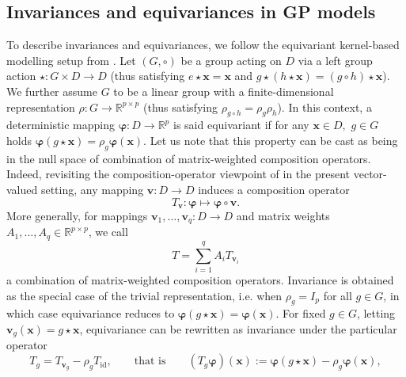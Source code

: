 \documentclass[11pt,a4paper]{article}
\newcommand{\bx}{\boldsymbol{x}}
\begin{document}
\subsection{Invariances and equivariances in GP  models}
\label{subsec:inv-eq-background}

To describe invariances and equivariances, we follow the  equivariant kernel-based modelling setup from \cite{JMLR:v8:reisert07a,steinertintegration}.
Let $(G,\circ)$ be a %
group acting on $D$ via a %
left group action $\star : G \times D \to D$ (thus satisfying $e \star \bx = \bx$ and $g \star (h \star \bx) = (g \circ h) \star \bx$). We further assume $G$ to be a linear group with a finite-dimensional representation  $\rho : G \to \mathbb{R}^{p \times p}$ (thus satisfying $\rho_{g \circ h} = \rho_g \rho_h$). In this context, a deterministic mapping $\boldsymbol{\varphi} : D \to \mathbb{R}^p$ is said equivariant if for any $\bx \in D,$ $g\in G$ holds  \begin{math}
    \boldsymbol{\varphi}(g \star \bx)=\rho_g \boldsymbol{\varphi}(\bx).
\end{math}
Let us note that this property can be cast as being in the null space of combination of matrix-weighted composition operators.
Indeed, revisiting the composition-operator viewpoint of \cite{GINSBOURGER2016117} in the present vector-valued setting, any mapping $\bm v : D \to D$ induces a composition operator \begin{displaymath}T_{\bm v} : \boldsymbol{\varphi}\mapsto \boldsymbol{\varphi}\circ \bm v.\end{displaymath}
More generally, for mappings $\bm v_1,\dots,\bm v_q : D \to D$ and matrix weights $A_1,\dots,A_q \in \mathbb{R}^{p\times p}$, we call
\begin{displaymath}T=\sum_{i=1}^q A_i T_{\bm v_i}\end{displaymath}
a combination of matrix-weighted composition operators. 
Invariance is obtained as the special case of the trivial representation, i.e. when $\rho_g=I_p$ for all $g\in G$, in which case equivariance reduces to $\boldsymbol{\varphi}(g\star\bx)=\boldsymbol{\varphi}(\bx)$.
For fixed $g\in G$, letting $\bm v_g(\bx)=g\star\bx$, equivariance can be rewritten as invariance under the particular operator
\begin{displaymath}T_g = T_{\bm v_g}-\rho_g T_{\mathrm{id}}, \qquad\text{that is}\qquad (T_g\boldsymbol{\varphi})(\bx) := \boldsymbol{\varphi}(g\star\bx)-\rho_g\boldsymbol{\varphi}(\bx),\end{displaymath}
\end{document}
